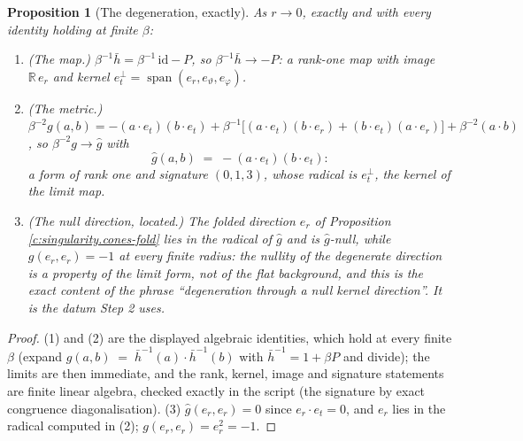 \documentclass[11pt]{article}
\newtheorem{proposition}[theorem]{Proposition}
\theoremstyle{definition}
\theoremstyle{plain}
\providecommand{\R}{}\renewcommand{\R}{\mathbb{R}}
\providecommand{\er}{}\renewcommand{\er}{e_r}
\providecommand{\et}{}\renewcommand{\et}{e_t}
\providecommand{\hb}{}\renewcommand{\hb}{\bar{h}}
\begin{document}
\begin{proposition}[The degeneration, exactly]\label{c:singularity.degeneration-exactly}
As $r \to 0$, exactly and with every identity holding at finite $\beta$:
\begin{enumerate}
\item (The map.) $\beta^{-1}\hb = \beta^{-1}\,\mathrm{id} - P$, so $\beta^{-1}\hb \to -P$: a rank-one map with image $\R\,\er$ and kernel $\et^{\perp} = \operatorname{span}(\er, e_\vartheta, e_\varphi)$.
\item (The metric.) $\beta^{-2} g(a,b) = -(a\cdot\et)(b\cdot\et) + \beta^{-1}\bigl[(a\cdot\et)(b\cdot\er) + (b\cdot\et)(a\cdot\er)\bigr] + \beta^{-2}(a \cdot b)$, so $\beta^{-2}g \to \hat g$ with
\[
\hat g(a,b) \;=\; -(a\cdot\et)(b\cdot\et) :
\]
a form of rank one and signature $(0,1,3)$, whose radical is $\et^{\perp}$, the kernel of the limit map.
\item (The null direction, located.) The folded direction $\er$ of Proposition \ref{c:singularity.cones-fold} lies in the radical of $\hat g$ and is $\hat g$-null, while $g(\er,\er) = -1$ at every finite radius: the nullity of the degenerate direction is a property of the limit form, not of the flat background, and this is the exact content of the phrase ``degeneration through a null kernel direction''. It is the datum Step 2 uses.
\end{enumerate}
\end{proposition}
\begin{proof}
(1) and (2) are the displayed algebraic identities, which hold at every finite $\beta$ (expand $g(a,b) \;=\; \hb^{-1}(a) \cdot \hb^{-1}(b)$ with $\hb^{-1} = 1 + \beta P$ and divide); the limits are then immediate, and the rank, kernel, image and signature statements are finite linear algebra, checked exactly in the script (the signature by exact congruence diagonalisation). (3) $\hat g(\er, \er) = 0$ since $\er \cdot \et = 0$, and $\er$ lies in the radical computed in (2); $g(\er,\er) = \er^2 = -1$.

\end{proof}
\end{document}
